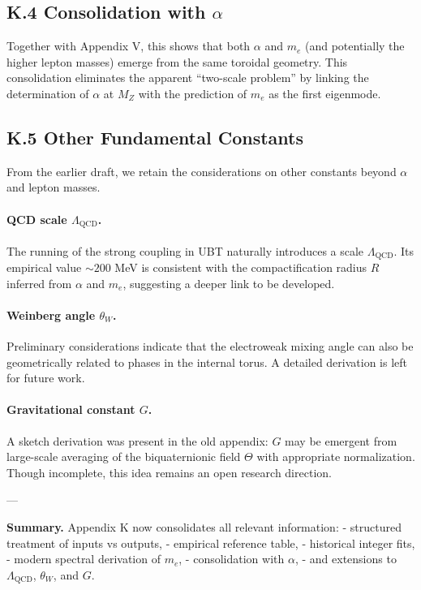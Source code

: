 \subsection*{K.4 Consolidation with $\alpha$}
Together with Appendix V, this shows that both $\alpha$ and $m_e$ (and potentially the higher lepton masses) emerge from the same toroidal geometry.  
This consolidation eliminates the apparent ``two-scale problem'' by linking the determination of $\alpha$ at $M_Z$ with the prediction of $m_e$ as the first eigenmode.

\subsection*{K.5 Other Fundamental Constants}
From the earlier draft, we retain the considerations on other constants beyond $\alpha$ and lepton masses.

\paragraph{QCD scale $\Lambda_{\text{QCD}}$.}  
The running of the strong coupling in UBT naturally introduces a scale $\Lambda_{\text{QCD}}$. Its empirical value $\sim 200$ MeV is consistent with the compactification radius $R$ inferred from $\alpha$ and $m_e$, suggesting a deeper link to be developed.

\paragraph{Weinberg angle $\theta_W$.}  
Preliminary considerations indicate that the electroweak mixing angle can also be geometrically related to phases in the internal torus. A detailed derivation is left for future work.

\paragraph{Gravitational constant $G$.}  
A sketch derivation was present in the old appendix: $G$ may be emergent from large-scale averaging of the biquaternionic field $\Theta$ with appropriate normalization. Though incomplete, this idea remains an open research direction.

---

\noindent \textbf{Summary.}  
Appendix K now consolidates all relevant information:  
- structured treatment of inputs vs outputs,  
- empirical reference table,  
- historical integer fits,  
- modern spectral derivation of $m_e$,  
- consolidation with $\alpha$,  
- and extensions to $\Lambda_{\text{QCD}}$, $\theta_W$, and $G$.

